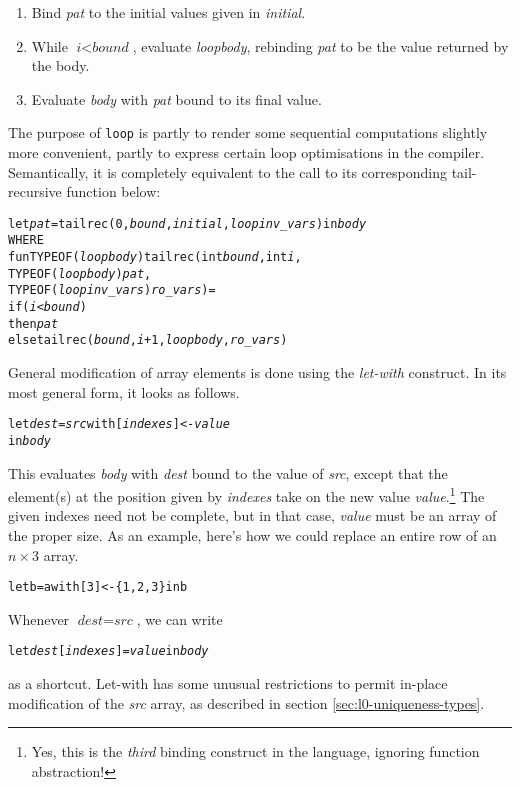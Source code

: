 \documentclass[oneside]{memoir}
\begin{document}
\begin{enumerate}
  \item Bind \textit{pat} to the initial values given in \textit{initial}.
  \item While $\textit{i} < \textit{bound}$, evaluate \textit{loopbody},
    rebinding \textit{pat} to be the value returned by the body.
  \item Evaluate \textit{body} with \textit{pat} bound to its final
    value.
\end{enumerate}
The purpose of \texttt{loop} is partly to render some sequential
computations slightly more convenient, partly to express certain loop
optimisations in the compiler.  Semantically, it is completely
equivalent to the call to its corresponding tail-recursive 
function below:
\begin{alltt}
    let {\em pat} = tailrec(0, \emph{bound}, \emph{initial}, \emph{loopinv\_vars}) in \emph{body}
  WHERE
    fun TYPEOF(\emph{loopbody}) tailrec (int \emph{bound}, int {\em i}, 
                                  TYPEOF(\emph{loopbody}) \emph{pat}, 
                                  TYPEOF(\emph{loopinv_vars}) \emph{ro\_vars}) =
        if (\emph{i} < \emph{bound}) 
        then \emph{pat}
        else tailrec(\emph{bound}, {\em i}+1, \emph{loopbody}, \emph{ro\_vars})
\end{alltt}

General modification of array elements is done using the
\emph{let-with} construct.  In its most general form, it looks as
follows.
\begin{alltt}
  let \textit{dest} = \textit{src} with [\textit{indexes}] <- \textit{value}
  in \textit{body}
\end{alltt}
This evaluates \textit{body} with \textit{dest} bound to the value of
\textit{src}, except that the element(s) at the position given by
\textit{indexes} take on the new value \textit{value}.\footnote{Yes,
  this is the \emph{third} binding construct in the language, ignoring
  function abstraction!}  The given indexes need not be complete, but
in that case, \textit{value} must be an array of the proper size.  As
an example, here's how we could replace an entire row of an
$n\times3$ array.
\begin{alltt}
  let b = a with [3] <- \{1,2,3\} in b
\end{alltt}
Whenever $\textit{dest} = \textit{src}$, we can write
\begin{alltt}
  let \textit{dest}[\textit{indexes}] = \textit{value} in \textit{body}
\end{alltt}
as a shortcut.  Let-with has some unusual restrictions to permit
in-place modification of the \textit{src} array, as described in
section \ref{sec:l0-uniqueness-types}.
\end{document}
